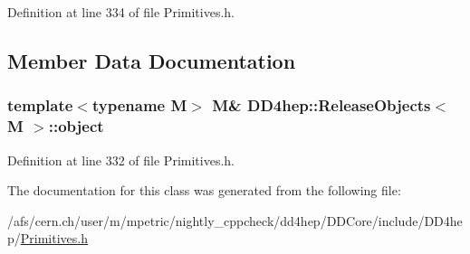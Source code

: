 Definition at line 334 of file Primitives.h.

\subsection{Member Data Documentation}
\hypertarget{class_d_d4hep_1_1_release_objects_a7f09cfa8646e892394904c47bb1faf98}{
\subsubsection[{object}]{\setlength{\rightskip}{0pt plus 5cm}template$<$typename M$>$ M\& {\bf DD4hep::ReleaseObjects}$<$ M $>$::{\bf object}}}
\label{class_d_d4hep_1_1_release_objects_a7f09cfa8646e892394904c47bb1faf98}


Definition at line 332 of file Primitives.h.

The documentation for this class was generated from the following file:\begin{DoxyCompactItemize}
\item 
/afs/cern.ch/user/m/mpetric/nightly\_\-cppcheck/dd4hep/DDCore/include/DD4hep/\hyperlink{_primitives_8h}{Primitives.h}\end{DoxyCompactItemize}
